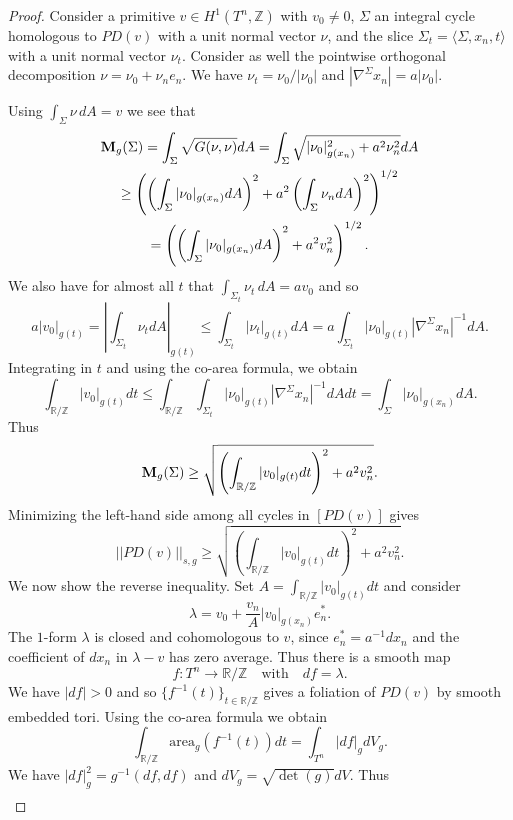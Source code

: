 \documentclass[11pt]{amsart}
\def\R{\mathbb R}
\def\Z{\mathbb Z}
\theoremstyle{remark}
\theoremstyle{definition}
\begin{document}
	\begin{proof}
		Consider a primitive $v\in H^1(T^n,\Z)$ with $v_0\neq 0$, $\Sigma$ an integral cycle homologous to $PD(v)$ with a unit normal vector $\nu$, and  the slice $\Sigma_t=\langle\Sigma,x_n,t\rangle$ with a unit normal vector $\nu_t$. Consider as well the pointwise orthogonal decomposition $\nu=\nu_0+\nu_ne_n$. We have $\nu_t=\nu_0/|\nu_0|$ and $|\nabla^\Sigma x_n|=a|\nu_0|$.
		
		Using $\int_{\Sigma}\nu\, dA=v$  we see that
		\begin{multline}\label{area.minimizing.stable}
			{\bf M}_{g}(\Sigma)=\int_\Sigma \sqrt{G(\nu,\nu)}dA=\int_\Sigma \sqrt{|\nu_0|^2_{g(x_n)}+a^2\nu_n^2}dA\\
			\geq\left(\left(\int_{\Sigma}|\nu_0|_{g(x_n)}dA\right)^2+a^2\left(\int_{\Sigma}\nu_ndA\right)^2\right)^{1/2}\\=\left(\left(\int_{\Sigma}|\nu_0|_{g(x_n)}dA\right)^2+a^2v_n^2\right)^{1/2}.
		\end{multline}
		We also have for almost all $t$ that $\int_{\Sigma_t}\nu_t\, dA=av_0$ and so
		$$a|v_0|_{g(t)}=\left| \int_{\Sigma_t}\nu_t dA\right|_{g(t)}\leq\int_{\Sigma_t}|\nu_t|_{g(t)}dA=a\int_{\Sigma_t}{|\nu_0|_{g(t)}}{|\nabla^\Sigma x_n|}^{-1}dA.$$
		Integrating in $t$ and using the co-area formula, we obtain
		$$\int_{\R/\Z}|v_0|_{g(t)}dt\leq \int_{\R/\Z}\int_{\Sigma_t}{|\nu_0|_{g(t)}}{|\nabla^\Sigma x_n|}^{-1}dAdt=\int_{\Sigma}|\nu_0|_{g(x_n)}dA.$$
		Thus 
		\begin{equation}\label{area.minimizing.stable0}
			{\bf M}_{g}(\Sigma)\geq \sqrt{\left(\int_{\R/\Z}|v_0|_{g(t)}dt\right)^{2}+a^2v_n^2}.
		\end{equation}
		Minimizing the left-hand side among all  cycles in $[PD(v)]$ gives
		$$||PD(v)||_{s,g}\geq \sqrt{\left(\int_{\R/\Z}|v_0|_{g(t)}dt\right)^{2}+a^2v_n^2}.$$
		We now show the reverse inequality. Set $A=\int_{\R/\Z}|v_0|_{g(t)}dt$ and consider
		$$\lambda=v_0+\frac{v_n}{A}|v_0|_{g(x_n)}e_n^*.$$
		The $1$-form $\lambda$ is closed  and cohomologous to $v$, since $e_n^*=a^{-1}dx_n$ and the coefficient of $dx_n$ in $\lambda-v$ has zero average. Thus there is a smooth map $$f:T^n\rightarrow \R/\Z\quad\text{with}\quad df=\lambda.$$
		We have $|d f|>0$ and so $\{f^{-1}(t)\}_{t\in \R/\Z}$ gives a foliation of $PD(v)$ by smooth embedded tori.  Using the co-area formula we obtain
		$$\int_{\R/\Z}\text{area}_g(f^{-1}(t))dt=\int_{T^n}|df|_{g}dV_g.$$
		We have $|df|_{g}^2=g^{-1}(df,df)$ and $dV_g=\sqrt{\det(g)}dV$. Thus
		\begin{multline*}

\end{multline*}
\end{proof}
\end{document}
